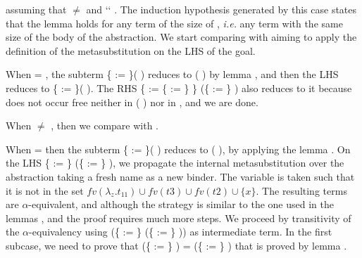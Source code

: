 \noindent assuming that  \ensuremath{\not=}  and  ``  . The induction hypothesis generated by this case states that the lemma holds for any term of the size of , {\it i.e.} any term with the same size of the body of the abstraction. We start comparing  with  aiming to apply the definition of the metasubstitution on the LHS of the goal.
\begin{coqdoccode}
\end{coqdoccode}
When  = , the subterm \{ := \}(  ) reduces to (  ) by lemma , and then the LHS reduces to \{ := \}(  ). The RHS \{ := \{ := \} \} (\{ := \}   ) also reduces to it because  does not occur free neither in (  ) nor in , and we are done.
\begin{coqdoccode}
\end{coqdoccode}
When  \ensuremath{\not=} , then we compare  with .
\begin{coqdoccode}
\end{coqdoccode}
When  =  then the subterm \{ := \}(  ) reduces to (  ), by applying the lemma . On the LHS \{ := \} (\{ := \}   ), we propagate the internal metasubstitution over the abstraction taking a fresh name  as a new binder. The variable  is taken such that it is not in the set $fv(\lambda_z.t_{11}) \cup fv(t3) \cup fv(t2) \cup \{x\}$. The resulting terms are $\alpha$-equivalent, and although the strategy is similar to the one used in the lemmas ,  and  the proof requires much more steps. We proceed by transitivity of the $\alpha$-equivalency using (\{ := \}   (\{ := \}    )) as intermediate term. In the first subcase, we need to prove that (\{ := \}   ) =   (\{ := \}    ) that is proved by lemma .
